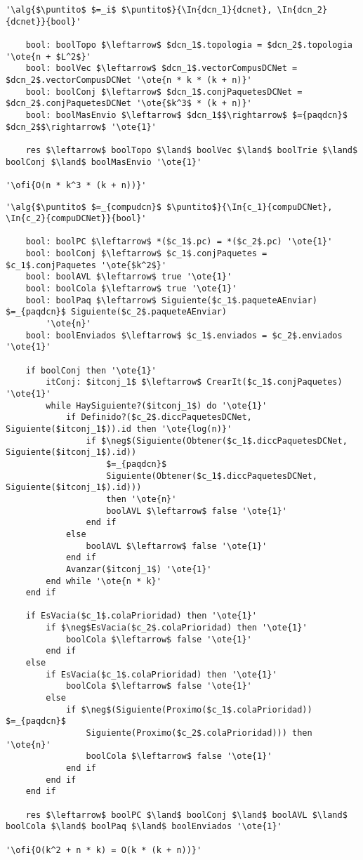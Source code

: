 \begin{lstlisting}[mathescape]
'\alg{$\puntito$ $=_i$ $\puntito$}{\In{dcn_1}{dcnet}, \In{dcn_2}{dcnet}}{bool}'

	bool: boolTopo $\leftarrow$ $dcn_1$.topologia = $dcn_2$.topologia '\ote{n + $L^2$}'
	bool: boolVec $\leftarrow$ $dcn_1$.vectorCompusDCNet = $dcn_2$.vectorCompusDCNet '\ote{n * k * (k + n)}'
	bool: boolConj $\leftarrow$ $dcn_1$.conjPaquetesDCNet = $dcn_2$.conjPaquetesDCNet '\ote{$k^3$ * (k + n)}'
	bool: boolMasEnvio $\leftarrow$ $dcn_1$$\rightarrow$ $={paqdcn}$ $dcn_2$$\rightarrow$ '\ote{1}'

	res $\leftarrow$ boolTopo $\land$ boolVec $\land$ boolTrie $\land$ boolConj $\land$ boolMasEnvio '\ote{1}'

'\ofi{O(n * k^3 * (k + n))}'
\end{lstlisting}

\begin{lstlisting}[mathescape]
'\alg{$\puntito$ $=_{compudcn}$ $\puntito$}{\In{c_1}{compuDCNet}, \In{c_2}{compuDCNet}}{bool}'

	bool: boolPC $\leftarrow$ *($c_1$.pc) = *($c_2$.pc) '\ote{1}'
	bool: boolConj $\leftarrow$ $c_1$.conjPaquetes = $c_1$.conjPaquetes '\ote{$k^2$}'
	bool: boolAVL $\leftarrow$ true '\ote{1}'
	bool: boolCola $\leftarrow$ true '\ote{1}'
	bool: boolPaq $\leftarrow$ Siguiente($c_1$.paqueteAEnviar) $=_{paqdcn}$ Siguiente($c_2$.paqueteAEnviar)
		'\ote{n}'
	bool: boolEnviados $\leftarrow$ $c_1$.enviados = $c_2$.enviados '\ote{1}'

	if boolConj then '\ote{1}'
		itConj: $itconj_1$ $\leftarrow$ CrearIt($c_1$.conjPaquetes) '\ote{1}'
		while HaySiguiente?($itconj_1$) do '\ote{1}'
			if Definido?($c_2$.diccPaquetesDCNet, Siguiente($itconj_1$)).id then '\ote{log(n)}'
				if $\neg$(Siguiente(Obtener($c_1$.diccPaquetesDCNet, Siguiente($itconj_1$).id))
					$=_{paqdcn}$
					Siguiente(Obtener($c_1$.diccPaquetesDCNet, Siguiente($itconj_1$).id)))
					then '\ote{n}'
					boolAVL $\leftarrow$ false '\ote{1}'
				end if
			else
				boolAVL $\leftarrow$ false '\ote{1}'
			end if
			Avanzar($itconj_1$) '\ote{1}'
		end while '\ote{n * k}'
	end if

	if EsVacia($c_1$.colaPrioridad) then '\ote{1}'
		if $\neg$EsVacia($c_2$.colaPrioridad) then '\ote{1}'
			boolCola $\leftarrow$ false '\ote{1}'
		end if
	else
		if EsVacia($c_1$.colaPrioridad) then '\ote{1}'
			boolCola $\leftarrow$ false '\ote{1}'
		else
			if $\neg$(Siguiente(Proximo($c_1$.colaPrioridad)) $=_{paqdcn}$
				Siguiente(Proximo($c_2$.colaPrioridad))) then '\ote{n}'
				boolCola $\leftarrow$ false '\ote{1}'
			end if
		end if
	end if

	res $\leftarrow$ boolPC $\land$ boolConj $\land$ boolAVL $\land$ boolCola $\land$ boolPaq $\land$ boolEnviados '\ote{1}'

'\ofi{O(k^2 + n * k) = O(k * (k + n))}'
\end{lstlisting}

